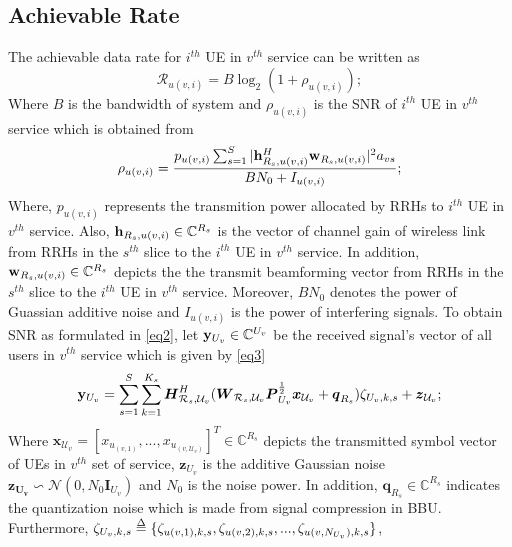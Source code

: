 \documentclass[conference]{IEEEtran}
\def\delequal{\mathrel{\ensurestackMath{\stackon[1pt]{=}{\scriptstyle\Delta}}}}
\begin{document}
\subsection{Achievable Rate}
The achievable data rate for $i^{th}$ UE in $v^{th}$ service can be written as 
\begin{equation}\label{eq1}
\mathcal{R}_{u(v,i)} = B \log_2({1+ \rho_{u(v,i)}});
\end{equation}
Where $B$ is the bandwidth of system and $\rho_{u(v,i)}$ is the SNR of $i^{th}$ UE in $v^{th}$ service which is obtained from 
\begin{equation}\label{eq2}
\rho_{u(v,i)} =  \frac{p_{u(v,i)}\sum_{s=1}^{S}|\bold{h}_{R_s,u(v,i)}^H \bold{w}_{R_s,u(v,i)}|^2 a_{vs}}{BN_0 + I_{u(v,i)}};
\end{equation}
Where, $p_{u(v,i)}$ represents the transmition power allocated by RRHs to $i^{th}$ UE in $v^{th}$ service. Also, 
$\bold{h}_{R_s,u(v,i)} \in \mathbb{C}^{{R}_s}$ is the vector of channel gain of wireless link from RRHs in the $s^{th}$ slice to the $i^{th}$ UE in $v^{th}$ service. In addition, $\bold{w}_{R_s,u(v,i)} \in \mathbb{C}^{{R}_s}$ depicts the the transmit beamforming vector from RRHs in the $s^{th}$ slice to the $i^{th}$ UE in $v^{th}$ service. Moreover, $BN_0$ denotes the power of Guassian additive noise and $I_{u(v,i)}$ is the power of interfering signals. 
To obtain SNR as formulated in \eqref{eq2}, let $\bold{y}_{U_v}\in \mathbb{C}^{U_v} $ be the received signal's vector of all users in $v^{th}$ service which is given by \eqref{eq3}
\begin{equation}\label{eq3}
\bold{y}_{U_v} = \sum_{s = 1}^{S}\sum_{k=1}^{K_s} \boldsymbol{H}^H_{\mathcal{R}_s,\mathcal{U}_v}(\boldsymbol{W}_{\mathcal{R}_s,\mathcal{U}_v}\boldsymbol{P}_{U_v}^{\frac{1}{2}}\boldsymbol{x}_{\mathcal{U}_v}+ \boldsymbol{q}_{R_s}) \zeta_{U_v,k,s}+ \boldsymbol{z}_{\mathcal{U}_v};
\end{equation}
Where $\boldsymbol{x}_{ \mathcal{U}_v} = [x_{ u_{(v,1)}},...,x_{ u_{(v,\mathcal{U}_v)}}]^T \in \mathbb{C}^{{R}_s } $ depicts the transmitted symbol vector of UEs in $v^{th}$ set of service,  $\boldsymbol{z}_{U_v}$ is the additive Gaussian noise $\boldsymbol{z_{U_v}} \backsim \mathcal{N}(0,N_0\boldsymbol{I}_{{U}_v})$ and $N_0$ is the noise power.
In addition, $\boldsymbol{q}_{R_s} \in \mathbb{C}^{{R}_s }  $ indicates the quantization noise which is made from signal compression in BBU.\newline
Furthermore, $\zeta_{U_v,k,s} \delequal \{\zeta_{u(v,1),k,s},\zeta_{u(v,2),k,s},...,\zeta_{u(v,N_{U_v}),k,s}\}$,
\end{document}
